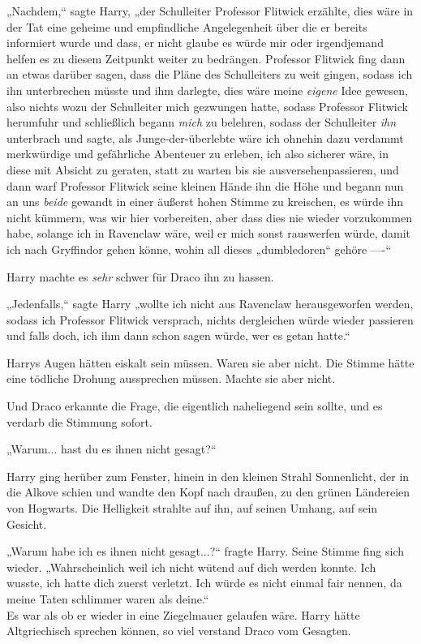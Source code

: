 {„Nachdem,“ sagte Harry, „der Schulleiter Professor Flitwick erzählte, dies wäre in der Tat eine geheime und empfindliche Angelegenheit über die er bereits informiert wurde und dass, er nicht glaube es würde mir oder irgendjemand helfen es zu diesem Zeitpunkt weiter zu bedrängen. Professor Flitwick fing dann an etwas darüber sagen, dass die Pläne des Schulleiters zu weit gingen, sodass ich ihn unterbrechen müsste und ihm darlegte, dies wäre meine \emph{eigene} Idee gewesen, also nichts wozu der Schulleiter mich gezwungen hatte, sodass Professor Flitwick herumfuhr und schließlich begann \emph{mich} zu belehren, sodass der Schulleiter \emph{ihn} unterbrach und sagte, als Junge-der-überlebte wäre ich ohnehin dazu verdammt merkwürdige und gefährliche Abenteuer zu erleben, ich also sicherer wäre, in diese mit Absicht zu geraten, statt zu warten bis sie ausversehenpassieren, und dann warf Professor Flitwick seine kleinen Hände ihn die Höhe und begann nun an uns \emph{beide} gewandt in einer äußerst hohen Stimme zu kreischen, es würde ihn nicht kümmern, was wir hier vorbereiten, aber dass dies nie wieder vorzukommen habe, solange ich in Ravenclaw wäre, weil er mich sonst rauswerfen würde, damit ich nach Gryffindor gehen könne, wohin all dieses „dumbledoren“ gehöre ----“

Harry machte es \emph{sehr} schwer für Draco ihn zu hassen.

„Jedenfalls,“ sagte Harry „wollte ich nicht aus Ravenclaw herausgeworfen werden, sodass ich Professor Flitwick versprach, nichts dergleichen würde wieder passieren und falls doch, ich ihm dann schon sagen würde, wer es getan hatte.“

Harrys Augen hätten eiskalt sein müssen. Waren sie aber nicht. Die Stimme hätte eine tödliche Drohung aussprechen müssen. Machte sie aber nicht.

Und Draco erkannte die Frage, die eigentlich naheliegend sein sollte, und es verdarb die Stimmung sofort.

„Warum... hast du es ihnen nicht gesagt?“

Harry ging herüber zum Fenster, hinein in den kleinen Strahl Sonnenlicht, der in die Alkove schien und wandte den Kopf nach draußen, zu den grünen Ländereien von Hogwarts. Die Helligkeit strahlte auf ihn, auf seinen Umhang, auf sein Gesicht.

„Warum habe ich es ihnen nicht gesagt...?“ fragte Harry. Seine Stimme fing sich wieder. „Wahrscheinlich weil ich nicht wütend auf dich werden konnte. Ich wusste, ich hatte dich zuerst verletzt. Ich würde es nicht einmal fair nennen, da meine Taten schlimmer waren als deine.“\\ Es war als ob er wieder in eine Ziegelmauer gelaufen wäre. Harry hätte Altgriechisch sprechen können, so viel verstand Draco vom Gesagten.

}
